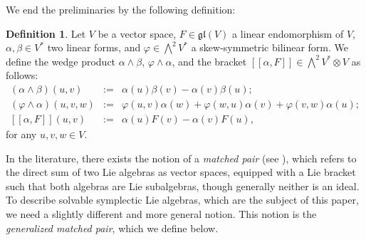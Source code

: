 \documentclass[final,1p,times,nopreprintline]{elsarticle}
\theoremstyle{definition}
\newtheorem{definition}{Definition}[section]
\numberwithin{equation}{section}
\numberwithin{equation}{section}
\newcommand{\gl}{\mathfrak{gl}}
\begin{document}
We end the preliminaries by the following definition:

\begin{definition}
Let $V$ be a vector space, $F\in\gl(V)$ a linear endomorphism of $V$, $\alpha,\beta\in V^*$ two linear forms, and $\varphi\in\bigwedge^2V^*$ a skew-symmetric bilinear form. We define the wedge product $\alpha\wedge\beta$, $\varphi\wedge\alpha$, and the bracket $[\![\alpha, F]\!] \in\bigwedge^2V^*\otimes V$ as follows: 
\begin{eqnarray*}
(\alpha\wedge\beta)(u,v)&:=&\alpha(u)\beta(v)-\alpha(v)\beta(u);\\
(\varphi\wedge\alpha)(u,v,w)&:=&\varphi(u,v)\alpha(w)+\varphi(w,u)\alpha(v)+\varphi(v,w)\alpha(u);\\
\left[\![\alpha, F]\!\right](u,v)&:=&\alpha(u)F(v)-\alpha(v)F(u),
\end{eqnarray*}
for any $u,v,w\in V$.
\end{definition}

In the literature, there exists the notion of a \textit{matched pair} (see \cite{LW,Maj}), which refers to the direct sum of two Lie algebras as vector spaces, equipped with a Lie bracket such that both algebras are Lie subalgebras, though generally neither is an ideal. To describe solvable symplectic Lie algebras, which are the subject of this paper, we need a slightly different and more general notion. This notion is the \textit{generalized matched pair}, which we define below.
\end{document}
